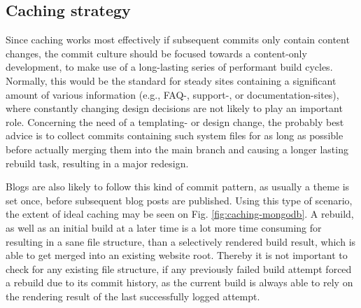 \subsection{Caching strategy}
Since caching works most effectively if subsequent commits only contain content changes, the commit culture should be focused towards a content-only development, to make use of a long-lasting series of performant build cycles. Normally, this would be the standard for steady sites containing a significant amount of various information (e.g., FAQ-, support-, or documentation-sites), where constantly changing design decisions are not likely to play an important role. Concerning the need of a templating- or design change, the probably best advice is to collect commits containing such system files for as long as possible before actually merging them into the main branch and causing a longer lasting rebuild task, resulting in a major redesign.

Blogs are also likely to follow this kind of commit pattern, as usually a theme is set once, before subsequent blog posts are published. Using this type of scenario, the extent of ideal caching may be seen on Fig. \ref{fig:caching-mongodb}. A rebuild, as well as an initial build at a later time is a lot more time consuming for resulting in a sane file structure, than a selectively rendered build result, which is able to get merged into an existing website root.
Thereby it is not important to check for any existing file structure, if any previously failed build attempt forced a rebuild due to its commit history, as the current build is always able to rely on the rendering result of the last successfully logged attempt.
